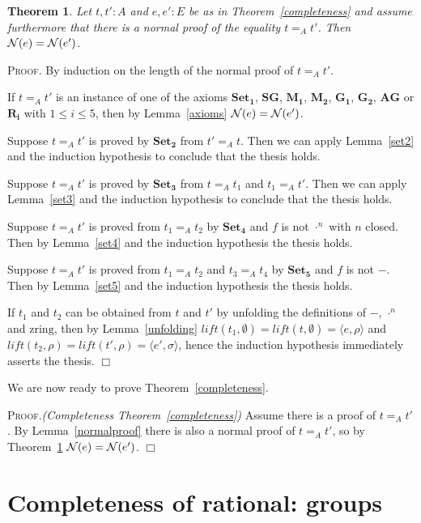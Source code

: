 \documentclass{article}
\newtheorem{theorem}[definition]{Theorem}
\newenvironment{proof}{\smallskip\textsc{Proof.}}{\hspace*{\fill}$\Box$}
\newcommand{\N}{{\cal N}}
\newcommand{\tacticname}[1]{\textsf{#1}}
\newcommand{\rational}{\tacticname{rational}}
\newcommand{\zring}{\ensuremath{\mathrm{zring}}}
\newcommand{\axiom}[1]{\ensuremath{\mathbf{#1}}}
\newcommand{\lift}{\ensuremath{\mathit{lift}}}
\begin{document}
\begin{theorem}\label{completenormal} 
Let $t,t':A$ and $e,e':E$ be as in Theorem~\ref{completeness} and
assume furthermore that there is a normal proof of the equality $t=_A t'$.
Then $\N(e)=\N(e')$.
\end{theorem}
\begin{proof}
By induction on the length of the normal proof of $t=_A t'$.

If $t=_A t'$ is an instance of one of the axioms \axiom{Set_1},
\axiom{SG}, \axiom{M_1}, \axiom{M_2}, \axiom{G_1}, \axiom{G_2},
\axiom{AG} or \axiom{R_i} with $1\leq i\leq5$, then by Lemma~\ref{axioms}
$\N(e)=\N(e')$.

Suppose $t=_A t'$ is proved by \axiom{Set_2} from $t'=_A t$.  Then we
can apply Lemma~\ref{set2} and the induction hypothesis to conclude that
the thesis holds.

Suppose $t=_A t'$ is proved by \axiom{Set_3} from $t=_A t_1$ and
$t_1=_A t'$.  Then we can apply Lemma~\ref{set3} and the induction
hypothesis to conclude that the thesis holds.

Suppose $t=_A t'$ is proved from $t_1=_A t_2$ by \axiom{Set_4} and
$f$ is not $\cdot^n$ with $n$ closed.  Then by Lemma~\ref{set4} and the
induction hypothesis the thesis holds.

Suppose $t=_A t'$ is proved from $t_1=_A t_2$ and $t_3=_A t_4$ by
\axiom{Set_5} and $f$ is not $-$.  Then by Lemma~\ref{set5} and the
induction hypothesis the thesis holds.

If $t_1$ and $t_2$ can be obtained from $t$ and $t'$ by unfolding the
definitions of $-$, $\cdot^n$ and $\zring$, then by Lemma~\ref{unfolding}
$\lift(t_1,\emptyset)=\lift(t,\emptyset)=\langle e,\rho\rangle$
and $\lift(t_2,\rho)=\lift(t',\rho)=\langle e',\sigma\rangle$, hence the
induction hypothesis immediately asserts the thesis.
\end{proof}

\bigskip

We are now ready to prove Theorem~\ref{completeness}.

\begin{proof}\emph{(Completeness Theorem~\ref{completeness})}
Assume there is a proof of $t=_A t'$.  By Lemma~\ref{normalproof} there is
also a normal proof of $t=_A t'$, so by Theorem~\ref{completenormal}
$\N(e)=\N(e')$.
\end{proof}

\section{Completeness of {\rational}: groups}\label{groups}
\end{document}
